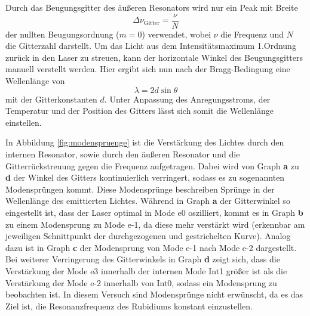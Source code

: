 Durch das Beugungsgitter des äußeren Resonators wird nur ein Peak mit Breite
\begin{equation}
  \Delta\nu_{\text{Gitter}} = \frac{\nu}{N}
\end{equation}
der nullten Beugungsordnung ($m=\num{0}$) verwendet, wobei $\nu$ die Frequenz
und $N$ die Gitterzahl darstellt. Um das Licht aus dem Intensitätsmaximum 1.Ordnung
zurück in den Laser zu streuen, kann der horizontale Winkel \theta des Beugungsgitters
manuell verstellt werden. Hier ergibt sich nun nach der Bragg-Bedingung eine
Wellenlänge von
\begin{equation}
    \lambda = 2d\sin{\theta}
\end{equation}
mit der Gitterkonstanten $d$.
Unter Anpassung des Anregungsstroms, der Temperatur und der Position des Gitters
lässt sich somit die Wellenlänge einstellen.


In Abbildung \ref{fig:modenspruenge} ist die Verstärkung des Lichtes durch den internen
Resonator, sowie durch den äußeren Resonator und die Gitterrückstreuung gegen
die Frequenz aufgetragen.
Dabei wird von Graph \textbf{a} zu \textbf{d} der Winkel des Gitters kontinuierlich verringert,
sodass es zu sogenannten Modensprüngen kommt.
Diese Modensprünge beschreiben Sprünge in der Wellenlänge des emittierten Lichtes.
Während in Graph \textbf{a} der Gitterwinkel so eingestellt ist, dass der Laser optimal in
Mode e0 oszilliert, kommt es in Graph \textbf{b} zu einem Modensprung zu Mode e-1,
da diese mehr verstärkt wird (erkennbar am jeweiligen Schnittpunkt der durchgezogenen und
gestrichelten Kurve).
Analog dazu ist in Graph \textbf{c} der Modensprung von Mode e-1 nach Mode e-2
dargestellt.
Bei weiterer Verringerung des Gitterwinkels in Graph \textbf{d} zeigt sich,
dass die Verstärkung der Mode e3 innerhalb der internen Mode Int1 größer ist
als die Verstärkung der Mode e-2 innerhalb von Int0, sodass ein Modensprung
zu beobachten ist. In diesem Versuch sind Modensprünge
nicht erwünscht, da es das Ziel ist, die Resonanzfrequenz des Rubidiums konstant
einzustellen.


